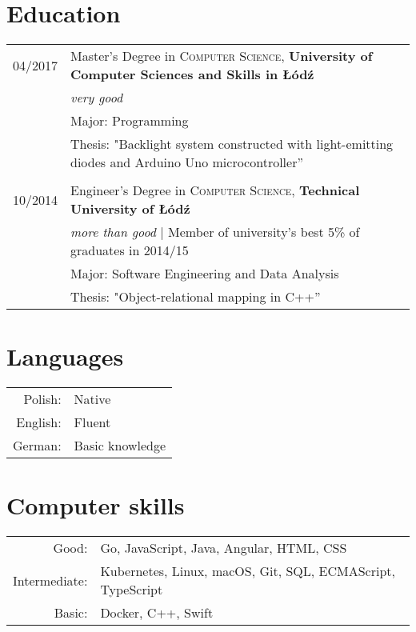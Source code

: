 \documentclass[a4paper,10pt]{article}
\begin{document}
\section{Education}

\begin{tabular}{rl}

04/2017 & Master's Degree in \textsc{Computer Science}, \textbf{University of Computer Sciences and Skills in Łódź} \\
& \small\emph{very good}\\
& \small  Major: Programming\\
& \small Thesis: "Backlight system constructed with light-emitting diodes and Arduino Uno microcontroller'' \\&\\

10/2014 & Engineer's Degree in \textsc{Computer Science}, \textbf{Technical University of Łódź} \\
& \small\emph{more than good} | Member of university’s best 5\% of graduates in 2014/15\\
& \small  Major: Software Engineering and Data Analysis \\
& \small Thesis: "Object-relational mapping in C++'' \\

\end{tabular}

\section{Languages}

\begin{tabular}{rl}
	Polish: & Native\\
	English: & Fluent\\
	German: & Basic knowledge\\
\end{tabular}

\section{Computer skills}

\begin{tabular}{rl}
  Good: & Go, JavaScript, Java, Angular, HTML, CSS\\
  Intermediate: & Kubernetes, Linux, macOS, Git, SQL, ECMAScript, TypeScript\\
	Basic: & Docker, C++, Swift\\
\end{tabular}
\end{document}
